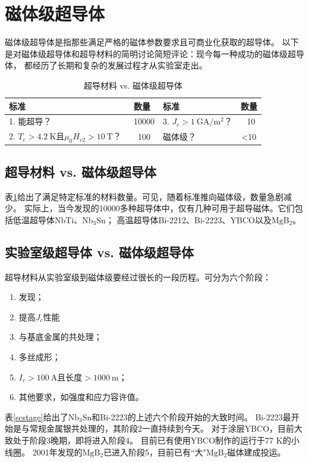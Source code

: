 \section{磁体级超导体}
磁体级超导体是指那些满足严格的磁体参数要求且可商业化获取的超导体。
以下是对磁体级超导体和超导材料的简明讨论简短评论：现今每一种成功的磁体级超导体，
都经历了长期和复杂的发展过程才从实验室走出。
\begin{table}[htbp]\small
  \centering
  \caption{超导材料 vs. 磁体级超导体} \label{scmaterialvsconductor}
\begin{tabular}{|l|c|l|c|}
  \hline
  标准 & 数量 & 标准 & 数量 \\ \hline\hline
  1. 能超导？ & ~10000 & 3. $J_c>1\ \mathrm{GA/m^2}$？ & ~10 \\ \hline
  2. $T_c> 4.2\ \mathrm{K}$且$\mu_0 H_{c2}>10\ \mathrm{T}$？ &~100 & 磁体级？ & <10 \\
  \hline
\end{tabular}
\end{table}

\subsection{超导材料 vs. 磁体级超导体}
表\ref{scmaterialvsconductor}给出了满足特定标准的材料数量。可见，随着标准推向磁体级，数量急剧减少。
实际上，当今发现的10000多种超导体中，仅有几种可用于超导磁体。它们包括低温超导体NbTi、$\mathrm{Nb_3Sn}$；
高温超导体Bi-2212、Bi-2223、YBCO以及$\mathrm{MgB_2}$。

\subsection{实验室级超导体 vs. 磁体级超导体}
超导材料从实验室级到磁体级要经过很长的一段历程。可分为六个阶段：
\begin{enumerate}
  \item 发现；
  \item 提高$J_c$性能
  \item 与基底金属的共处理；
  \item 多丝成形；
  \item $I_c>100\ \mathrm{A}$且长度$>1000\ \mathrm{m}$；
  \item 其他要求，如强度和应力容许值。
\end{enumerate}

表\ref{scstage}给出了$\mathrm{Nb_3Sn}$和Bi-2223的上述六个阶段开始的大致时间。
Bi-2223最开始是与常规金属银共处理的，其阶段2一直持续到今天。
对于涂层YBCO，目前大致处于阶段3晚期，即将进入阶段4。
目前已有使用YBCO制作的运行于77 K的小线圈。
2001年发现的$\mathrm{MgB_2}$已进入阶段5，目前已有``大"$\mathrm{MgB_2}$磁体建成投运。

